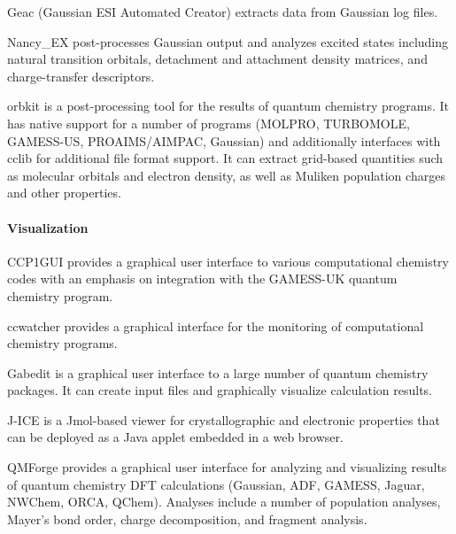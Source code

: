 Geac (Gaussian ESI Automated Creator) extracts data from Gaussian log files. 

Nancy\_EX \cite{Etienne_2014} post-processes Gaussian output and analyzes excited states including natural transition orbitals, detachment and attachment density matrices, and charge-transfer descriptors.

orbkit \cite{hermann2016orbkit} is a post-processing tool for the results of quantum chemistry programs.  It has native support for a number of programs (MOLPRO, TURBOMOLE, GAMESS-US, PROAIMS/AIMPAC, Gaussian) and additionally interfaces with cclib for additional file format support.  It can extract grid-based quantities such as molecular orbitals and electron density, as well as Muliken population charges and other properties.


\paragraph{Visualization}
CCP1GUI provides a graphical user interface to various computational chemistry codes with an emphasis on integration with the GAMESS-UK quantum chemistry program.

ccwatcher provides a graphical interface for the monitoring of computational chemistry programs.

Gabedit \cite{Allouche_2010} is a graphical user interface to a large number of quantum chemistry packages. It can create input files and graphically visualize calculation results.

J-ICE \cite{Canepa_2010} is a Jmol-based viewer for crystallographic and electronic properties that can be deployed as a Java applet embedded in a web browser.
 
QMForge provides a graphical user interface for analyzing and visualizing results of quantum chemistry DFT calculations (Gaussian, ADF, GAMESS, Jaguar, NWChem, ORCA, QChem).  Analyses include a number of population analyses, Mayer's bond order, charge decomposition, and fragment analysis.
